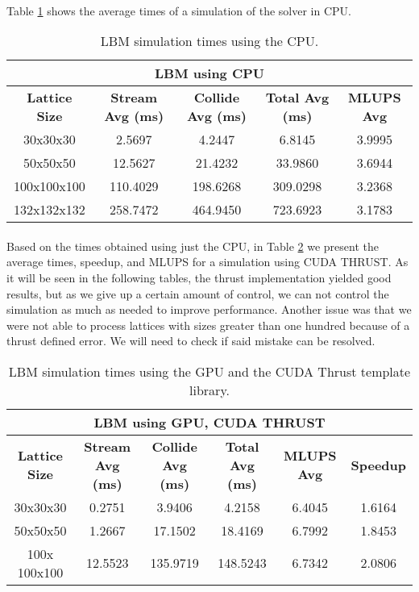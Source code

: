 \paragraph{}Table \ref{tab:lbm_cpu} shows the average times of a simulation of the solver in CPU. 

\begin{table}[htbp]
  \centering
    \begin{tabular}{|c|c|c|c|c|}
    \toprule
    \multicolumn{5}{c}{\textbf{LBM using CPU}} \\
    \midrule
    \textbf{Lattice Size	} & \textbf{Stream Avg (ms)} &	 \textbf{Collide Avg (ms)} & \textbf{Total Avg (ms)} & \textbf{MLUPS Avg} \\ 
    30x30x30 & 	2.5697	 & 4.2447& 6.8145& 3.9995\\
    50x50x50&	12.5627&	21.4232&33.9860&3.6944\\
	100x100x100&110.4029&198.6268&309.0298&	3.2368\\
	132x132x132&	258.7472&464.9450&723.6923&3.1783\\
    \bottomrule
    \end{tabular}%
    \caption{LBM simulation times using the CPU.}
  \label{tab:lbm_cpu}%
\end{table}%

\paragraph{}Based on the times obtained using just the CPU, in Table \ref{tab:lbm_gpu_thrust} we present the average times, speedup, and MLUPS for a simulation using CUDA THRUST. As it will be seen in the following tables, the thrust implementation yielded good results, but as we give up a certain amount of control, we can not control the simulation as much as needed to improve performance. Another issue was that we were not able to process lattices with sizes greater than one hundred because of a thrust defined error. We will need to check if said mistake can be resolved.

\begin{table}[htbp]
  \centering
    \begin{tabular}{|c|c|c|c|c|c|}
    \toprule
    \multicolumn{6}{c}{\textbf{LBM using GPU, CUDA THRUST}} \\
    \midrule
    \textbf{Lattice Size	} & \textbf{Stream Avg (ms)} &	\textbf{ Collide Avg (ms)} & \textbf{Total Avg (ms)} & \textbf{MLUPS Avg} &\textbf{Speedup}\\
    30x30x30	&0.2751 &	3.9406 	&4.2158 	&6.4045 	&1.6164 \\
	50x50x50 &1.2667&	17.1502&	18.4169&	6.7992&	1.8453\\
	100x	100x100&	12.5523 	&135.9719 &	148.5243&	6.7342 &	2.0806  \\
    \bottomrule
    \end{tabular}%
       \caption{LBM simulation times using the GPU and the CUDA Thrust template library.}
  \label{tab:lbm_gpu_thrust}%
\end{table}%

